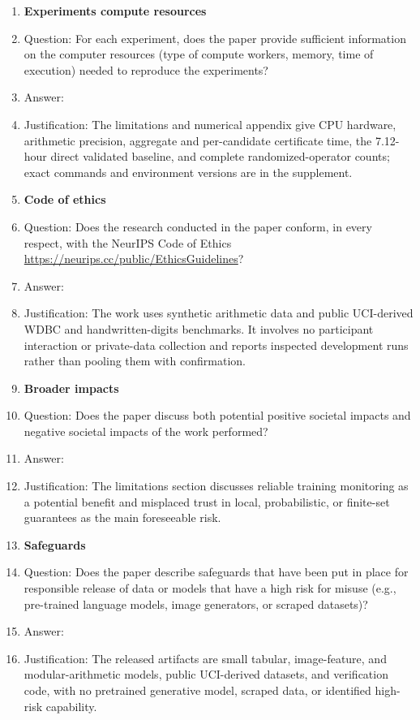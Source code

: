 \begin{enumerate}
\item {\bf Experiments compute resources}
    \item[] Question: For each experiment, does the paper provide sufficient information on the computer resources (type of compute workers, memory, time of execution) needed to reproduce the experiments?
    \item[] Answer: \answerYes{}
    \item[] Justification: The limitations and numerical appendix give CPU hardware, arithmetic precision, aggregate and per-candidate certificate time, the 7.12-hour direct validated baseline, and complete randomized-operator counts; exact commands and environment versions are in the supplement.

\item {\bf Code of ethics}
    \item[] Question: Does the research conducted in the paper conform, in every respect, with the NeurIPS Code of Ethics \url{https://neurips.cc/public/EthicsGuidelines}?
    \item[] Answer: \answerYes{}
    \item[] Justification: The work uses synthetic arithmetic data and public UCI-derived WDBC and handwritten-digits benchmarks. It involves no participant interaction or private-data collection and reports inspected development runs rather than pooling them with confirmation.

\item {\bf Broader impacts}
    \item[] Question: Does the paper discuss both potential positive societal impacts and negative societal impacts of the work performed?
    \item[] Answer: \answerYes{}
    \item[] Justification: The limitations section discusses reliable training monitoring as a potential benefit and misplaced trust in local, probabilistic, or finite-set guarantees as the main foreseeable risk.

\item {\bf Safeguards}
    \item[] Question: Does the paper describe safeguards that have been put in place for responsible release of data or models that have a high risk for misuse (e.g., pre-trained language models, image generators, or scraped datasets)?
    \item[] Answer: \answerNA{}
    \item[] Justification: The released artifacts are small tabular, image-feature, and modular-arithmetic models, public UCI-derived datasets, and verification code, with no pretrained generative model, scraped data, or identified high-risk capability.


\end{enumerate}
